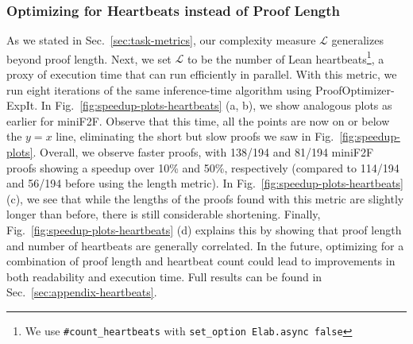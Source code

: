 \subsubsection{Optimizing for Heartbeats instead of Proof Length} \label{subsubsec:heartbeats-optimization}

As we stated in Sec.~\ref{sec:task-metrics}, our complexity measure $\mathcal{L}$ generalizes beyond proof length. Next, we set $\mathcal{L}$ to be the number of Lean heartbeats\footnote{We use \texttt{\#count\_heartbeats} with \texttt{set\_option Elab.async false}}, a proxy of execution time that can run efficiently in parallel. With this metric, we run eight iterations of the same inference-time algorithm using ProofOptimizer-ExpIt. In Fig.~\ref{fig:speedup-plots-heartbeats} (a, b), we show analogous plots as earlier for miniF2F. Observe that this time, all the points are now on or below the $y=x$ line, eliminating the short but slow proofs we saw in Fig.~\ref{fig:speedup-plots}. Overall, we observe faster proofs, with 138/194 and 81/194 miniF2F proofs showing a speedup over 10\% and 50\%, respectively (compared to 114/194 and 56/194 before using the length metric). In Fig.~\ref{fig:speedup-plots-heartbeats} (c), we see that while the lengths of the proofs found with this metric are slightly longer than before, there is still considerable shortening. Finally, Fig.~\ref{fig:speedup-plots-heartbeats} (d) explains this by showing that proof length and number of heartbeats are generally correlated. In the future, optimizing for a combination of proof length and heartbeat count could lead to improvements in both readability and execution time. Full results can be found in Sec.~\ref{sec:appendix-heartbeats}.



